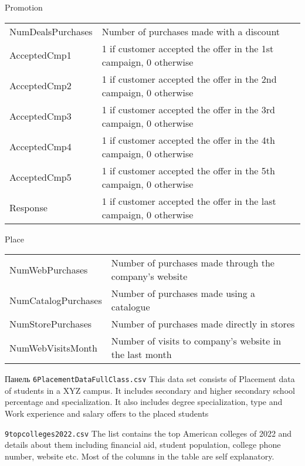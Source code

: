 \documentclass[12pt]{article}
\theoremstyle{remark}
\begin{document}
\begin{table}
Promotion\\
	\begin{tabular}{l|l}\hline
NumDealsPurchases & Number of purchases made with a discount \\
AcceptedCmp1 & 1 if customer accepted the offer in the 1st campaign, 0 otherwise \\
AcceptedCmp2 & 1 if customer accepted the offer in the 2nd campaign, 0 otherwise \\
AcceptedCmp3 & 1 if customer accepted the offer in the 3rd campaign, 0 otherwise \\
AcceptedCmp4 & 1 if customer accepted the offer in the 4th campaign, 0 otherwise \\
AcceptedCmp5 & 1 if customer accepted the offer in the 5th campaign, 0 otherwise \\
Response & 1 if customer accepted the offer in the last campaign, 0 otherwise
		\end{tabular}
Place\\
		\begin{tabular}{l|l}\hline
NumWebPurchases &Number of purchases made through the company’s website \\
NumCatalogPurchases & Number of purchases made using a catalogue \\
NumStorePurchases & Number of purchases made directly in stores \\
NumWebVisitsMonth & Number of visits to company’s website in the last month\\
	\end{tabular}
\end{table}


\begin{table}
	\caption{Панель \texttt{6PlacementDataFullClass.csv}
	This data set consists of Placement data of students in a XYZ campus. It includes secondary and higher secondary school percentage and specialization. It also includes degree specialization, type and Work experience and salary offers to the placed students}
\end{table}



\begin{table}
	\caption{ \texttt{9topcolleges2022.csv}
The list contains the top American colleges of 2022 and details about them including financial aid, student population, college phone number, website etc.
Most of the columns in the table are self explanatory.}
\end{table}
\end{document}
